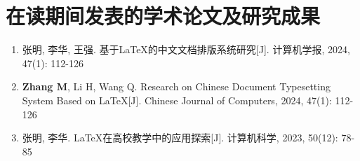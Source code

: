 \section*{在读期间发表的学术论文及研究成果}

\begin{enumerate}
\item 张明, 李华, 王强. 基于LaTeX的中文文档排版系统研究[J]. 计算机学报, 2024, 47(1): 112-126

\item \textbf{Zhang M}, Li H, Wang Q. Research on Chinese Document Typesetting System Based on LaTeX[J]. Chinese Journal of Computers, 2024, 47(1): 112-126

\item 张明, 李华. LaTeX在高校教学中的应用探索[J]. 计算机科学, 2023, 50(12): 78-85
\end{enumerate}